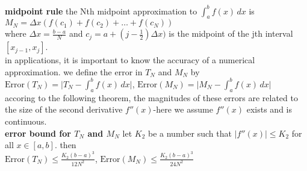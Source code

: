 \documentclass{article}
\begin{document}
\textbf{midpoint rule} the Nth midpoint approximation to $\int_{a}^{b}f(x)\,dx$ is\\
$M_N = \Delta x(f(c_1) + f(c_2) + \ldots + f(c_N))$\\
where $\Delta x = \frac{b - a}{N}$ and $c_j = a + (j - \frac{1}{2})\Delta x)$ is the midpoint of the jth interval $[x_{j-1}, x_j]$.\\

in applications, it is important to know the accuracy of a numerical approximation. we define the error in $T_N$ and $M_N$ by\\
$\text{Error}(T_N) = \lvert T_N - \int_{a}^{b}f(x)\,dx\rvert$, $\text{Error}(M_N) = \lvert M_N - \int_{a}^{b}f(x)\,dx\rvert$\\
accoring to the following theorem, the magnitudes of these errors are related to the size of the second derivative $f''(x)$-here we assume $f''(x)$ exists and is continuous.\\

\textbf{error bound for $T_N$ and $M_N$} let $K_2$ be a number such that $\lvert f''(x)\rvert \leq K_2$ for all $x \in [a, b]$. then\\
$\text{Error}(T_N) \leq \frac{K_2(b-a)^3}{12N^2}$, $\text{Error}(M_N) \leq \frac{K_2(b - a)^3}{24N^2}$\\
\end{document}
